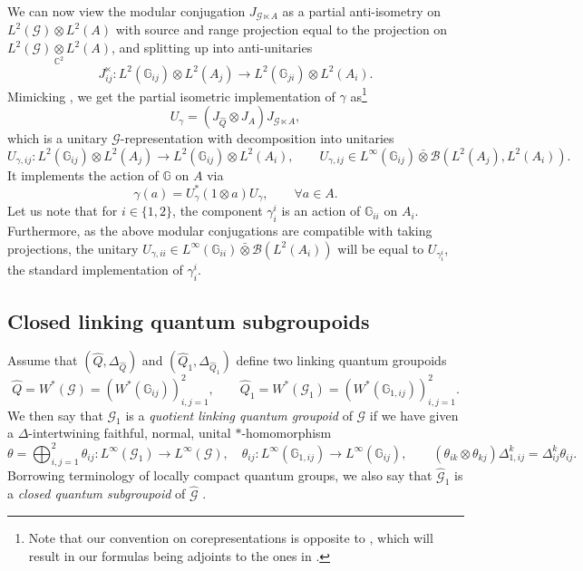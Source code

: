 \documentclass[reqno]{amsart}
\numberwithin{equation}{section}
\newcommand{\C}{\mathbb{C}}
\newcommand{\mcB}{\mathcal{B}}
\newcommand{\G}{\mathbb{G}}
\newcommand{\msG}{\mathscr{G}}
\begin{document}
We can now view the modular conjugation $J_{\msG\ltimes A}$ as a partial anti-isometry on $L^2(\msG) \otimes L^2(A)$ with source and range projection equal to the projection on $L^2(\msG) \underset{\C^2}{\otimes} L^2(A)$, and splitting up into anti-unitaries 
\[
J^{\ltimes}_{ij}\colon L^2(\G_{ij}) \otimes L^2(A_j) \rightarrow L^2(\G_{ji}) \otimes L^2(A_i).
\] 
Mimicking \cite{Vae01}, we get the partial isometric implementation of $\gamma$ as\footnote{Note that our convention on corepresentations is opposite to \cite{Vae01}, which will result in our formulas being adjoints to the ones in \cite{Vae01}.}
\begin{equation}\label{EqIsometImpl}
U_{\gamma} = (J_{\hat{Q}}\otimes J_A)J_{\msG \ltimes A},
\end{equation}
which is a unitary $\msG$-representation with decomposition into unitaries
\[
U_{\gamma,ij}\colon L^2(\G_{ij}) \otimes L^2(A_j) \rightarrow L^2(\G_{ij})\otimes L^2(A_i),\qquad U_{\gamma,ij} \in L^{\infty}(\G_{ij})\bar{\otimes} \mcB(L^2(A_j),L^2(A_i)).
\]
It implements the action of $\G$ on $A$ via 
\[
\gamma(a) = U_{\gamma}^*(1\otimes a)U_{\gamma},\qquad \forall a \in A. 
\]
Let us note that for $i\in \{1,2\}$, the component $\gamma_i^i$ is an action of $\G_{ii}$ on $A_i$. Furthermore, as the above modular conjugations are compatible with taking projections, the unitary $U_{\gamma,ii}\in L^{\infty}(\G_{ii})\bar\otimes \mcB(L^2(A_i))$ will be equal to $U_{\gamma_i^i}$, the standard implementation of $\gamma^i_i$.

\subsection{Closed linking quantum subgroupoids}

Assume that $(\hat{Q},\Delta_{\hat{Q}})$ and $(\hat{Q}_1,\Delta_{\hat{Q}_1})$ define two linking quantum groupoids
\[
\hat{Q} = W^*(\msG) =  (W^*(\G_{ij}))_{i,j=1}^{2},\qquad \hat{Q}_1 = W^*(\msG_1) = (W^*(\G_{1,ij}))_{i,j=1}^{2}.
\]
We then say that $\msG_1$ is a \emph{quotient linking quantum groupoid} of $\msG$ if we have given a $\Delta$-intertwining faithful, normal, unital $*$-homomorphism
\[
\theta = \bigoplus_{i,j=1}^{2}\theta_{ij}\colon L^{\infty}(\msG_1) \rightarrow L^{\infty}(\msG),\quad \theta_{ij}\colon L^{\infty}(\G_{1,ij}) \rightarrow L^{\infty}(\G_{ij}),\qquad   (\theta_{ik}\otimes \theta_{kj})\Delta_{1,ij}^k = \Delta_{ij}^k \theta_{ij}. 
\]
Borrowing terminology of locally compact quantum groups, we also say that $\hat{\msG}_1$ is a \emph{closed quantum subgroupoid} of $\hat{\msG}$ \cites{Vae05,DKSS12}. 
\end{document}
